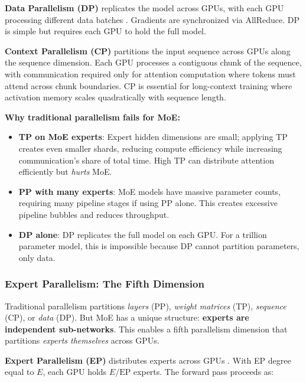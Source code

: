 \textbf{Data Parallelism (DP)} replicates the model across GPUs, with each GPU processing different data batches \cite{shallue2019measuringeffectsdataparallelism,bai2022moderndistributeddataparallellargescale}. Gradients are synchronized via AllReduce. DP is simple but requires each GPU to hold the full model.

\textbf{Context Parallelism (CP)} \cite{korthikanti2023sequence,liu2023ringattention,jacobs2023deepspeedulysses} partitions the input sequence across GPUs along the sequence dimension. Each GPU processes a contiguous chunk of the sequence, with communication required only for attention computation where tokens must attend across chunk boundaries. CP is essential for long-context training where activation memory scales quadratically with sequence length.

\textbf{Why traditional parallelism fails for MoE:}

\begin{itemize}
    \item \textbf{TP on MoE experts}: Expert hidden dimensions are small; applying TP creates even smaller shards, reducing compute efficiency while increasing communication's share of total time. High TP can distribute attention efficiently but \emph{hurts} MoE.
    \item \textbf{PP with many experts}: MoE models have massive parameter counts, requiring many pipeline stages if using PP alone. This creates excessive pipeline bubbles and reduces throughput.
    \item \textbf{DP alone}: DP replicates the full model on each GPU. For a trillion parameter model, this is impossible because DP cannot partition parameters, only data.
\end{itemize}

\subsubsection{Expert Parallelism: The Fifth Dimension}\label{sec:expert-parallelism}

Traditional parallelism partitions \emph{layers} (PP), \emph{weight matrices} (TP), \emph{sequence} (CP), or \emph{data} (DP). But MoE has a unique structure: \textbf{experts are independent sub-networks}. This enables a fifth parallelism dimension that partitions \emph{experts themselves} across GPUs.

\textbf{Expert Parallelism (EP)} distributes experts across GPUs \cite{lepikhin2020gshard}. With EP degree equal to $E$, each GPU holds $E/\text{EP}$ experts. The forward pass proceeds as:

